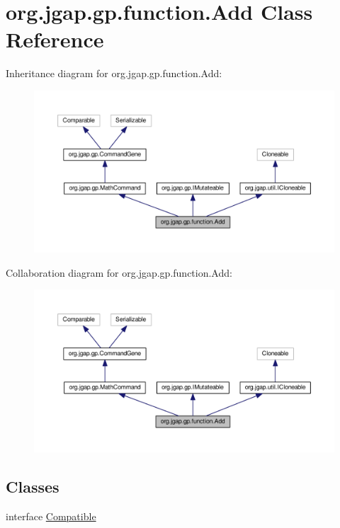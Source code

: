\hypertarget{classorg_1_1jgap_1_1gp_1_1function_1_1_add}{\section{org.\-jgap.\-gp.\-function.\-Add Class Reference}
\label{classorg_1_1jgap_1_1gp_1_1function_1_1_add}
}


Inheritance diagram for org.\-jgap.\-gp.\-function.\-Add\-:
\nopagebreak
\begin{figure}[H]
\begin{center}
\leavevmode
\includegraphics[width=350pt]{classorg_1_1jgap_1_1gp_1_1function_1_1_add__inherit__graph}
\end{center}
\end{figure}


Collaboration diagram for org.\-jgap.\-gp.\-function.\-Add\-:
\nopagebreak
\begin{figure}[H]
\begin{center}
\leavevmode
\includegraphics[width=350pt]{classorg_1_1jgap_1_1gp_1_1function_1_1_add__coll__graph}
\end{center}
\end{figure}
\subsection*{Classes}
\begin{DoxyCompactItemize}
\item 
interface \hyperlink{interfaceorg_1_1jgap_1_1gp_1_1function_1_1_add_1_1_compatible}{Compatible}
\end{DoxyCompactItemize}
